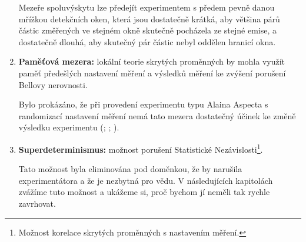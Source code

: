 \begin{enumerate}
        Mezeře spoluvýskytu lze předejít experimentem s předem pevně danou mřížkou detekčních oken, která jsou dostatečně krátká, aby většina párů částic změřených ve stejném okně skutečně pocházela ze stejné emise, a dostatečně dlouhá, aby skutečný pár částic nebyl oddělen hranicí okna.

        \item \textbf{Paměťová mezera:} lokální teorie skrytých proměnných by mohla využít paměť předešlých nastavení měření a výsledků měření ke zvýšení porušení Bellovy nerovnosti.
        
        Bylo prokázáno, že při provedení experimentu typu Alaina Aspecta \parencite*{belltest:2} s randomizací nastavení měření nemá tato mezera dostatečný účinek ke změně výsledku experimentu (\cite{measloop:1}; \cite{measloop:2}; \cite{measloop:3}).

        \clearpage
        
        \item \textbf{Superdeterminismus:} možnost porušení Statistické Nezávislosti\footnote[5]{Možnost korelace skrytých proměnných s nastavením měření.}.
        
        Tato možnost byla eliminována pod doměnkou, že by narušila  experimentátora a že  je nezbytná pro vědu. V následujících kapitolách zvážíme tuto možnost a ukážeme si, proč bychom jí neměli tak rychle zavrhovat.
    \end{enumerate}
    